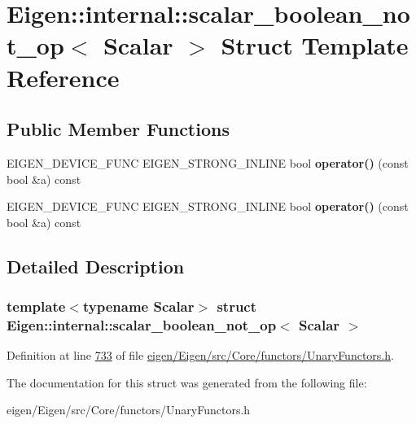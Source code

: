 \hypertarget{struct_eigen_1_1internal_1_1scalar__boolean__not__op}{}\section{Eigen\+:\+:internal\+:\+:scalar\+\_\+boolean\+\_\+not\+\_\+op$<$ Scalar $>$ Struct Template Reference}
\label{struct_eigen_1_1internal_1_1scalar__boolean__not__op}
\subsection*{Public Member Functions}
\begin{DoxyCompactItemize}
\item 
\mbox{\label{struct_eigen_1_1internal_1_1scalar__boolean__not__op_a781b0e19b1eeae19ae662440110e7e67}} 
E\+I\+G\+E\+N\+\_\+\+D\+E\+V\+I\+C\+E\+\_\+\+F\+U\+NC E\+I\+G\+E\+N\+\_\+\+S\+T\+R\+O\+N\+G\+\_\+\+I\+N\+L\+I\+NE bool {\bfseries operator()} (const bool \&a) const
\item 
\mbox{\label{struct_eigen_1_1internal_1_1scalar__boolean__not__op_a781b0e19b1eeae19ae662440110e7e67}} 
E\+I\+G\+E\+N\+\_\+\+D\+E\+V\+I\+C\+E\+\_\+\+F\+U\+NC E\+I\+G\+E\+N\+\_\+\+S\+T\+R\+O\+N\+G\+\_\+\+I\+N\+L\+I\+NE bool {\bfseries operator()} (const bool \&a) const
\end{DoxyCompactItemize}


\subsection{Detailed Description}
\subsubsection*{template$<$typename Scalar$>$\newline
struct Eigen\+::internal\+::scalar\+\_\+boolean\+\_\+not\+\_\+op$<$ Scalar $>$}



Definition at line \hyperlink{eigen_2_eigen_2src_2_core_2functors_2_unary_functors_8h_source_l00733}{733} of file \hyperlink{eigen_2_eigen_2src_2_core_2functors_2_unary_functors_8h_source}{eigen/\+Eigen/src/\+Core/functors/\+Unary\+Functors.\+h}.



The documentation for this struct was generated from the following file\+:\begin{DoxyCompactItemize}
\item 
eigen/\+Eigen/src/\+Core/functors/\+Unary\+Functors.\+h\end{DoxyCompactItemize}
